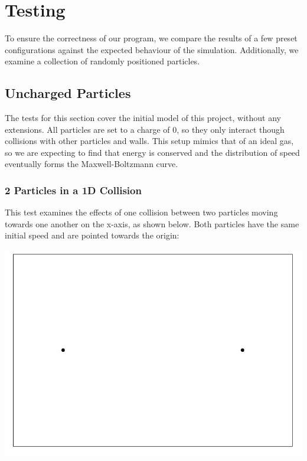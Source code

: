 \documentclass{article}
\begin{document}
\section{Testing}
To ensure the correctness of our program,
we compare the results of a few preset configurations against the expected behaviour of the simulation.
Additionally, we examine a collection of randomly positioned particles.

\subsection{Uncharged Particles}
The tests for this section cover the initial model of this project, without any extensions.
All particles are set to a charge of 0, so they only interact though collisions with other particles and walls.
This setup mimics that of an ideal gas, so we are expecting to find that energy is conserved and
the distribution of speed eventually forms the Maxwell-Boltzmann curve.

\subsubsection{2 Particles in a 1D Collision}
This test examines the effects of one collision between two particles moving towards one another on the x-axis,
as shown below. Both particles have the same initial speed and are pointed towards the origin:
\\
\begin{center}
\includegraphics[scale=0.5]{uncharged_2_particles_1D}
\end{center}
\end{document}

